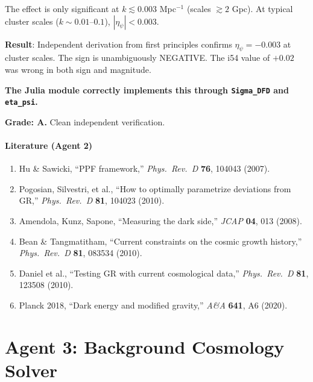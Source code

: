 \documentclass[11pt,a4paper]{article}
\begin{document}
The effect is only significant at $k \lesssim 0.003$ Mpc$^{-1}$ (scales $\gtrsim 2$ Gpc). At typical cluster scales ($k \sim 0.01$--$0.1$), $|\eta_\psi| < 0.003$.

\begin{tcolorbox}[colback=green!5!white, colframe=green!60!black, title={Agent 2: $\eta_\psi$ Independently Verified}]
\textbf{Result}: Independent derivation from first principles confirms $\eta_\psi = -0.003$ at cluster scales. The sign is unambiguously NEGATIVE. The i54 value of $+0.02$ was wrong in both sign and magnitude.

\textbf{The Julia module correctly implements this through \texttt{Sigma\_DFD} and \texttt{eta\_psi}.}

\textbf{Grade: A.} Clean independent verification.
\end{tcolorbox}

\subsection{Literature (Agent 2)}

\begin{enumerate}
\item Hu \& Sawicki, ``PPF framework,'' \textit{Phys.\ Rev.\ D} \textbf{76}, 104043 (2007).
\item Pogosian, Silvestri, et al., ``How to optimally parametrize deviations from GR,'' \textit{Phys.\ Rev.\ D} \textbf{81}, 104023 (2010).
\item Amendola, Kunz, Sapone, ``Measuring the dark side,'' \textit{JCAP} \textbf{04}, 013 (2008).
\item Bean \& Tangmatitham, ``Current constraints on the cosmic growth history,'' \textit{Phys.\ Rev.\ D} \textbf{81}, 083534 (2010).
\item Daniel et al., ``Testing GR with current cosmological data,'' \textit{Phys.\ Rev.\ D} \textbf{81}, 123508 (2010).
\item Planck 2018, ``Dark energy and modified gravity,'' \textit{A\&A} \textbf{641}, A6 (2020).
\end{enumerate}


\part{Agent 3: Background Cosmology Solver}
\label{part:background}
\end{document}
